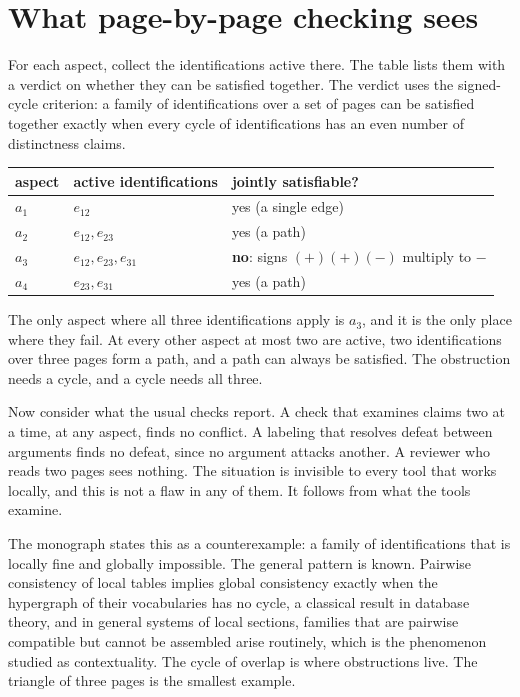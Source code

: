 \documentclass[11pt]{article}
\begin{document}
\section{What page-by-page checking sees}\label{sec:pages}

For each aspect, collect the identifications active there. The table lists them with a verdict on whether they can be satisfied together. The verdict uses the signed-cycle criterion: a family of identifications over a set of pages can be satisfied together exactly when every cycle of identifications has an even number of distinctness claims.

\begin{center}
\small
\begin{tabular}{@{}l l l@{}}
\toprule
aspect & active identifications & jointly satisfiable?\\
\midrule
$a_1$ & $e_{12}$ & yes (a single edge)\\
$a_2$ & $e_{12},e_{23}$ & yes (a path)\\
$a_3$ & $e_{12},e_{23},e_{31}$ & \textbf{no}: signs $(+)(+)(-)$ multiply to $-$\\
$a_4$ & $e_{23},e_{31}$ & yes (a path)\\
\bottomrule
\end{tabular}
\end{center}

The only aspect where all three identifications apply is $a_3$, and it is the only place where they fail. At every other aspect at most two are active, two identifications over three pages form a path, and a path can always be satisfied. The obstruction needs a cycle, and a cycle needs all three.

Now consider what the usual checks report. A check that examines claims two at a time, at any aspect, finds no conflict. A labeling that resolves defeat between arguments finds no defeat, since no argument attacks another. A reviewer who reads two pages sees nothing. The situation is invisible to every tool that works locally, and this is not a flaw in any of them. It follows from what the tools examine.

The monograph states this as a counterexample: a family of identifications that is locally fine and globally impossible. The general pattern is known. Pairwise consistency of local tables implies global consistency exactly when the hypergraph of their vocabularies has no cycle, a classical result in database theory, and in general systems of local sections, families that are pairwise compatible but cannot be assembled arise routinely, which is the phenomenon studied as contextuality. The cycle of overlap is where obstructions live. The triangle of three pages is the smallest example.
\end{document}
